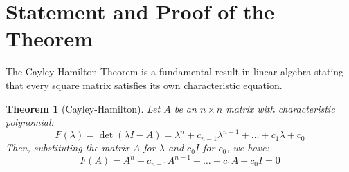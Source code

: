 \documentclass[12pt,a4paper]{report}
\newtheorem{theorem}{Theorem}[chapter]
\theoremstyle{definition}
\numberwithin{equation}{chapter}
\begin{document}
\section{Statement and Proof of the Theorem}
The Cayley-Hamilton Theorem is a fundamental result in linear algebra stating that every square matrix satisfies its own characteristic equation.

\begin{theorem}[Cayley-Hamilton]
Let $A$ be an $n \times n$ matrix with characteristic polynomial:
\begin{equation}
F(\lambda) = \det(\lambda I - A) = \lambda^n + c_{n-1}\lambda^{n-1} + \dots + c_1\lambda + c_0
\end{equation}
Then, substituting the matrix $A$ for $\lambda$ and $c_0 I$ for $c_0$, we have:
\begin{equation}
F(A) = A^n + c_{n-1}A^{n-1} + \dots + c_1 A + c_0 I = 0
\end{equation}
\end{theorem}
\end{document}
